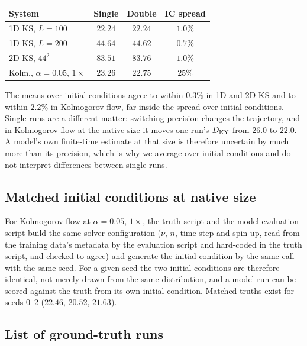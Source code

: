 \begin{center}
\begin{tabular}{lccc}
\hline\hline
System & Single & Double & IC spread \\
\hline
1D KS, $L=100$ & $22.24$ & $22.24$ & $1.0\%$ \\
1D KS, $L=200$ & $44.64$ & $44.62$ & $0.7\%$ \\
2D KS, $44^2$ & $83.51$ & $83.76$ & $1.0\%$ \\
Kolm., $\alpha=0.05$, $1\times$ & $23.26$ & $22.75$ & $25\%$ \\
\hline\hline
\end{tabular}
\end{center}
The means over initial conditions agree to within $0.3\%$ in 1D and 2D
KS and to within $2.2\%$ in Kolmogorov flow, far inside the spread over
initial conditions. Single runs are a different matter: switching
precision changes the trajectory, and in Kolmogorov flow at the native
size it moves one run's $D_{\mathrm{KY}}$ from $26.0$ to $22.0$. A model's own
finite-time estimate at that size is therefore uncertain by much more
than its precision, which is why we average over initial conditions and
do not interpret differences between single runs.

\subsection{Matched initial conditions at native size}
\label{app:matched_ics}

For Kolmogorov flow at $\alpha=0.05$, $1\times$, the truth script and the
model-evaluation script build the same solver configuration ($\nu$, $n$,
time step and spin-up, read from the training data's metadata by the
evaluation script and hard-coded in the truth script, and checked to
agree) and generate the initial condition by the same call with the same
seed. For a given seed the two initial conditions are therefore
identical, not merely drawn from the same distribution, and a model run
can be scored against the truth from its own initial condition. Matched
truths exist for seeds 0--2 ($22.46$, $20.52$, $21.63$).

\subsection{List of ground-truth runs}
\label{app:truth_list}

